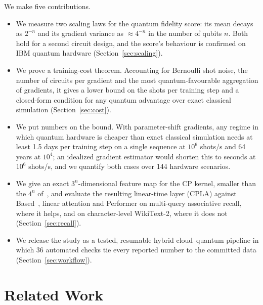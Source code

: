 \documentclass[conference]{IEEEtran}
\theoremstyle{definition}
\newcommand{\cpla}{CPLA}
\begin{document}
\noindent We make five contributions.
\begin{itemize}
  \item We measure two scaling laws for the quantum fidelity score: its mean decays as $2^{-n}$ and its gradient variance as $\approx 4^{-n}$ in the number of qubits $n$. Both hold for a second circuit design, and the score's behaviour is confirmed on IBM quantum hardware (Section~\ref{sec:scaling}).
  \item We prove a training-cost theorem. Accounting for Bernoulli shot noise, the number of circuits per gradient and the most quantum-favourable aggregation of gradients, it gives a lower bound on the shots per training step and a closed-form condition for any quantum advantage over exact classical simulation (Section~\ref{sec:cost}).
  \item We put numbers on the bound. With parameter-shift gradients, any regime in which quantum hardware is cheaper than exact classical simulation needs at least 1.5 days per training step on a single sequence at $10^6$ shots/s and 64 years at $10^4$; an idealized gradient estimator would shorten this to seconds at $10^6$ shots/s, and we quantify both cases over 144 hardware scenarios.
  \item We give an exact $3^n$-dimensional feature map for the CP kernel, smaller than the $4^n$ of~\cite{singuru2026fidelity}, and evaluate the resulting linear-time layer (\cpla) against Based~\cite{arora2024based}, linear attention and Performer on multi-query associative recall, where it helps, and on character-level WikiText-2, where it does not (Section~\ref{sec:recall}).
  \item We release the study as a tested, resumable hybrid cloud--quantum pipeline in which 36 automated checks tie every reported number to the committed data (Section~\ref{sec:workflow}).
\end{itemize}

\section{Related Work}
\end{document}

